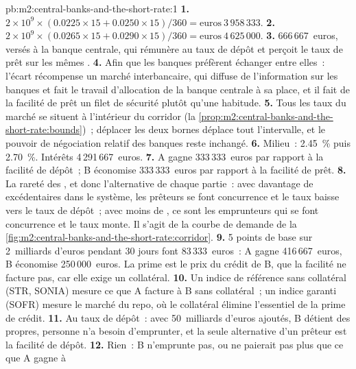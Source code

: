 \begin{solution}{pb:m2:central-banks-and-the-short-rate:1}
\textbf{1.} $2 \times 10^9 \times (0.0225 \times 15 + 0.0250 \times 15)/360 =
\text{euros}~3\,958\,333$.
\textbf{2.} $2 \times 10^9 \times (0.0265 \times 15 + 0.0290 \times 15)/360 =
\text{euros}~4\,625\,000$.
\textbf{3.} 666\,667~euros, versés à la banque centrale, qui rémunère au taux de dépôt
et perçoit le taux de prêt sur les mêmes .
\textbf{4.} Afin que les banques préfèrent échanger entre elles~: l'écart récompense un
marché interbancaire, qui diffuse de l'information sur les banques et fait le
travail d'allocation de la banque centrale à sa place, et il fait de la facilité de prêt un
filet de sécurité plutôt qu'une habitude.
\textbf{5.} Tous les taux du marché se situent à l'intérieur du corridor
(la \cref{prop:m2:central-banks-and-the-short-rate:bounds})~; déplacer les deux bornes
déplace tout l'intervalle, et le pouvoir de négociation relatif des banques reste inchangé.
\textbf{6.} Milieu~: 2.45~\% puis 2.70~\%. Intérêts 4\,291\,667~euros.
\textbf{7.} A gagne 333\,333~euros par rapport à la facilité de dépôt~; B économise
333\,333~euros par rapport à la facilité de prêt.
\textbf{8.} La rareté des , et donc l'alternative de chaque partie~:
avec davantage de  excédentaires dans le système, les prêteurs se font concurrence et le taux baisse
vers le taux de dépôt~; avec moins de , ce sont les emprunteurs qui se font concurrence et le taux monte. Il s'agit
de la courbe de demande de la \cref{fig:m2:central-banks-and-the-short-rate:corridor}.
\textbf{9.} 5 points de base sur 2~milliards d'euros pendant 30 jours font 83\,333~euros~: A
gagne 416\,667~euros, B économise 250\,000~euros. La prime est le prix du
crédit de B, que la facilité ne facture pas, car elle exige un collatéral.
\textbf{10.} Un indice de référence sans collatéral (\texteuro STR, SONIA) mesure ce que A
facture à B sans collatéral~; un indice garanti (SOFR) mesure le marché du repo,
où le collatéral élimine l'essentiel de la prime de crédit.
\textbf{11.} Au taux de dépôt~: avec 50~milliards d'euros ajoutés, B détient des 
propres, personne n'a besoin d'emprunter, et la seule alternative d'un prêteur est la
facilité de dépôt.
\textbf{12.} Rien~: B n'emprunte pas, ou ne paierait pas plus que ce que A gagne à

\end{solution}
